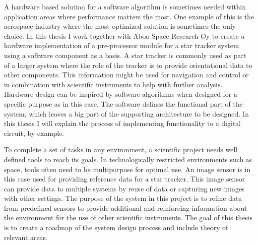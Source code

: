 \documentclass[12pt]{report}
\begin{document}
A hardware based solution for a software algorithm is sometimes needed within application areas where performance matters the most. One example of this is the aerospace industry where the most optimized solution is sometimes the only choice. In this thesis I work together with Aboa Space Research Oy to create a hardware implementation of a pre-processor module for a star tracker system using a software component as a basis. A star tracker is commonly used as part of a larger system where the role of the tracker is to provide orientational data to other components. This information might be used for navigation and control or in combination with scientific instruments to help with further analysis.
Hardware design can be inspired by software algorithms when designed for a specific purpose as in this case. The software defines the functional part of the system, which leaves a big part of the supporting architecture to be designed. In this thesis I will explain the process of implementing functionality to a digital circuit, by example.



\par

To complete a set of tasks in any environment, a scientific project needs well defined tools to reach its goals. In technologically restricted environments such as space, tools often need to be multipurpose for optimal use. An image sensor is in this case used for providing reference data for a star tracker. This image sensor can provide data to multiple systems by reuse of data or capturing new images with other settings. The purpose of the system in this project is to refine data from predefined sensors to provide additional and reinforcing information about the environment for the use of other scientific instruments. The goal of this thesis is to create a roadmap of the system design process and include theory of relevant areas.
\end{document}
